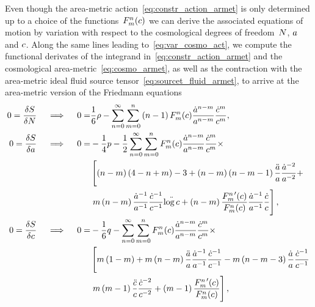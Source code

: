 Even though the area-metric action~\eqref{eq:constr_action_armet} is only determined up to a choice of the functions~$\Func{\Nind}{\nind}\ofc$ we can derive the associated equations of motion by variation with respect to the cosmological degrees of freedom~$\Nlapse$, $\scalea$ and $\scalec$. Along the same lines leading to~\eqref{eq:var_cosmo_act}, we compute the functional derivates of the integrand in~\eqref{eq:constr_action_armet} and the cosmological area-metric~\eqref{eq:cosmo_armet}, as well as the contraction with the area-metric ideal fluid source tensor~\eqref{eq:sourcet_fluid_armet}, to arrive at the area-metric version of the Friedmann equations
\begin{subequations}
\begin{align}
	0=\functderiv{\act}{\Nlapse} \quad \implies \quad 0=&\frac{1}{6}\dens-\sum_{\Nind=0}^\infty\sum_{\nind=0}^\Nind\left(\Nind-1\right)\Func{\Nind}{\nind}\ofc\lndt[\Nind-\nind]{\scalea}\lndt[\nind]{\scalec} \label{eq:armet_eom_Nlapse}\eqpunct{,}\\
	0=\functderiv{\act}{\scalea} \quad \implies \quad 0=&-\frac{1}{4}\press-\frac{1}{2}\sum_{\Nind=0}^\infty\sum_{\nind=0}^\Nind\Func{\Nind}{\nind}\ofc\lndt[\Nind-\nind]{\scalea}\lndt[\nind]{\scalec}\times\nonumber\\
		&\left[\left(\Nind-\nind\right)\left(4-\Nind+\nind\right)-3+\left(\Nind-\nind\right)\left(\Nind-\nind-1\right)\frac{\ddt{\scalea}}{\scalea}\lndt[-2]{\scalea}+\right.\nonumber\\
		&\left.\nind\left(\Nind-\nind\right)\lndt[-1]{\scalea}\lndt[-1]{\scalec}\ddt{\log\scalec}+\left(\Nind-\nind\right)\frac{\Func{\Nind}{\nind}^\prime\ofc}{\Func{\Nind}{\nind}\ofc}\lndt[-1]{\scalea}\lndt{\scalec}\right] \label{eq:armet_eom_scalea}\eqpunct{,}\\
	0=\functderiv{\act}{\scalec} \quad \implies \quad 0=&-\frac{1}{6}\q-\sum_{\Nind=0}^\infty\sum_{\nind=0}^\Nind\Func{\Nind}{\nind}\ofc\lndt[\Nind-\nind]{\scalea}\lndt[\nind]{\scalec}\times\nonumber\\
		&\left[\nind\left(1-\nind\right)+\nind\left(\Nind-\nind\right)\frac{\ddt{\scalea}}{\scalea}\lndt[-1]{\scalea}\lndt[-1]{\scalec}-\nind\left(\Nind-\nind-3\right)\lndt{\scalea}\lndt[-1]{\scalec}\right.\nonumber\\
		&\left.\nind\left(\nind-1\right)\frac{\ddt{\scalec}}{\scalec}\lndt[-2]{\scalec}+\left(\nind-1\right)\frac{\Func{\Nind}{\nind}^\prime\ofc}{\Func{\Nind}{\nind}\ofc}\right] \label{eq:armet_eom_scalec}\eqpunct{,}
\end{align}
\end{subequations}
